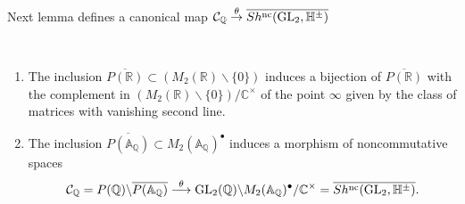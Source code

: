 \documentclass[graybox, envcountsect%
]{svmult}
\def\GL{{\rm GL}}
\def\A{{\mathbb A}}
\def\C{{\mathbb C}}
\def\Q{{\mathbb Q}}
\def\R{{\mathbb R}}
\def\H{{\mathbb H}}
\def\cC{{\mathcal C}}
\def\caq{{\cC_\Q}}
\def\no{\noindent}
\begin{document}
\no Next lemma defines a canonical map $\caq \stackrel{\theta}{\to}\overline{Sh^{\rm nc}(\GL_2,\H^\pm)}$

\begin{lemma}\label{fundinclusion} \
\begin{enumerate}
\item[(i)] The inclusion $\overline{P(\R)}\subset (M_2(\R)\smallsetminus
\{0 \})$ induces a bijection of $\overline{P(\R)}$ with the complement in $(M_2(\R)\smallsetminus
\{0 \})/\C^\times$ of the point $\infty$ given by the class of matrices with vanishing second line.
\item[(ii)] The inclusion $\overline{P(\A_\Q)}\subset M_2(\A_\Q)^\bullet$ induces a morphism of noncommutative spaces
\begin{equation}\label{P2gl20}
	\caq=P(\Q)\backslash
\overline{P(\A_\Q)}\stackrel{\theta}{\longrightarrow} \GL_2(\Q)\backslash
M_2(\A_\Q)^\bullet /\C^\times	=\overline{Sh^{\rm nc}(\GL_2,\H^\pm)}.
\end{equation}
\end{enumerate}
\end{lemma}
\end{document}
